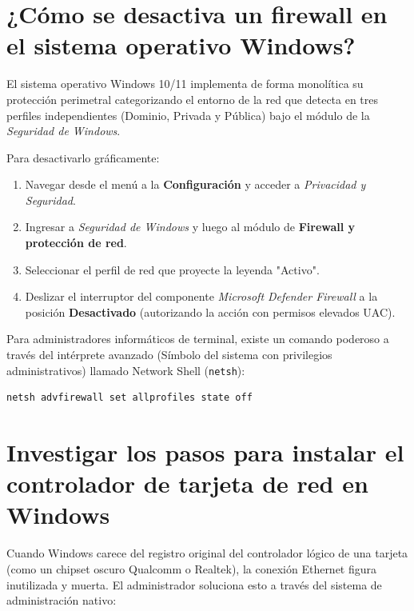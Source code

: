 \documentclass[a4paper,12pt]{article}
\begin{document}
\section{¿Cómo se desactiva un firewall en el sistema operativo Windows?}

El sistema operativo Windows 10/11 implementa de forma monolítica su protección perimetral categorizando el entorno de la red que detecta en tres perfiles independientes (Dominio, Privada y Pública) bajo el módulo de la \textit{Seguridad de Windows}.

Para desactivarlo gráficamente:
\begin{enumerate}
    \item Navegar desde el menú a la \textbf{Configuración} y acceder a \textit{Privacidad y Seguridad}.
    \item Ingresar a \textit{Seguridad de Windows} y luego al módulo de \textbf{Firewall y protección de red}.
    \item Seleccionar el perfil de red que proyecte la leyenda "Activo".
    \item Deslizar el interruptor del componente \textit{Microsoft Defender Firewall} a la posición \textbf{Desactivado} (autorizando la acción con permisos elevados UAC).
\end{enumerate}

Para administradores informáticos de terminal, existe un comando poderoso a través del intérprete avanzado (Símbolo del sistema con privilegios administrativos) llamado Network Shell (\texttt{netsh}):
\begin{lstlisting}
netsh advfirewall set allprofiles state off
\end{lstlisting}

\section{Investigar los pasos para instalar el controlador de tarjeta de red en Windows}

Cuando Windows carece del registro original del controlador lógico de una tarjeta (como un chipset oscuro Qualcomm o Realtek), la conexión Ethernet figura inutilizada y muerta. El administrador soluciona esto a través del sistema de administración nativo:
\end{document}
